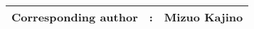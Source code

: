 {\bf \Large
\begin{tabular}{ccc}
\hline
  Corresponding author & : & Mizuo Kajino\\
\hline
\end{tabular}
}
